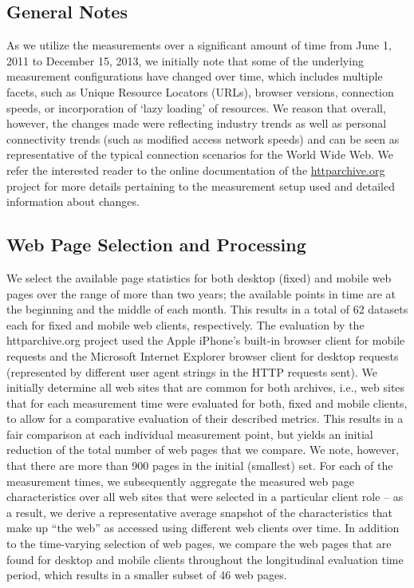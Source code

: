 \documentclass[journal,final]{IEEEtran}
\begin{document}
\subsection{General Notes}
As we utilize the measurements over a significant amount of time from June 1, 2011 to December 15, 2013, we initially note that some of the underlying measurement configurations have changed over time, which includes multiple facets, such as Unique Resource Locators (URLs), browser versions, connection speeds, or incorporation of `lazy loading' of resources.
We reason that overall, however, the changes made were reflecting industry trends as well as personal connectivity trends (such as modified access network speeds) and can be seen as representative of the typical connection scenarios for the World Wide Web.
We refer the interested reader to the online documentation of the \url{httparchive.org} project for more details pertaining to the measurement setup used and detailed information about changes.

\subsection{Web Page Selection and Processing}
We select the available page statistics for both desktop (fixed) and mobile web pages over the range of more than two years; the available points in time are at the beginning and the middle of each month.
This results in a total of 62 datasets each for fixed and mobile web clients, respectively.
The evaluation by the httparchive.org project used the Apple iPhone's built-in browser client for mobile requests and the Microsoft Internet Explorer browser client for desktop requests (represented by different user agent strings in the HTTP requests sent).
We initially determine all web sites that are common for both archives, i.e., web sites that for each measurement time were evaluated for both, fixed and mobile clients, to allow for a comparative evaluation of their described metrics.
This results in a fair comparison at each individual measurement point, but yields an initial reduction of the total number of web pages that we compare. We note, however, that there are more than 900 pages in the initial (smallest) set. 
For each of the measurement times, we subsequently aggregate the measured web page characteristics over all web sites that were selected in a particular client role -- as a result, we derive a representative average snapshot of the characteristics that make up ``the web'' as accessed using different web clients over time.
In addition to the time-varying selection of web pages, we compare the web pages that are found for desktop and mobile clients throughout the longitudinal evaluation time period, which results in a smaller subset of 46 web pages.
\end{document}
